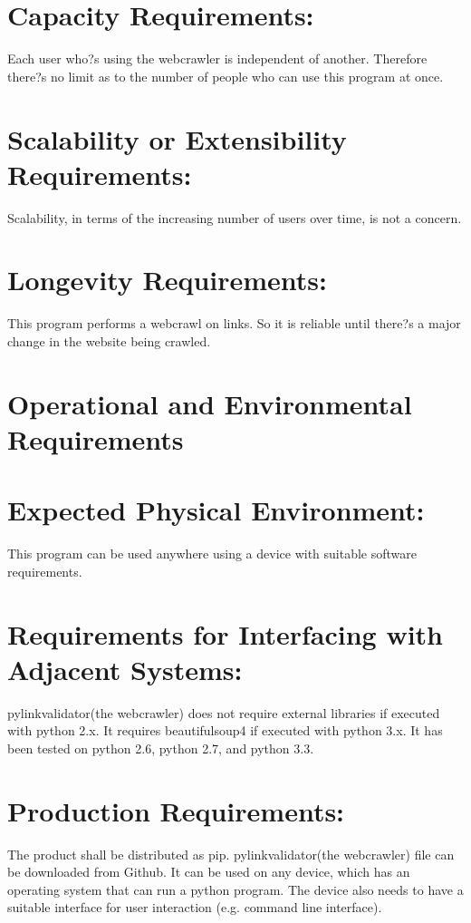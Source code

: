 \documentclass[12pt]{article}
\begin{document}
\section*{Capacity Requirements:}
Each user who?s using the webcrawler is independent of another. Therefore there?s no limit as to the number of people who can use this program at once.

\section*{Scalability or Extensibility Requirements:}
Scalability, in terms of the increasing number of users over time, is not a concern.

\section*{Longevity Requirements:}
This program performs a webcrawl on links. So it is reliable until there?s a major change in the website being crawled.

\section*{Operational and Environmental Requirements }

\section*{Expected Physical Environment:}
This program can be used anywhere using a device with suitable software requirements. 

\section*{Requirements for Interfacing with Adjacent Systems:}
pylinkvalidator(the webcrawler) does not require external libraries if executed with python 2.x. It requires beautifulsoup4 if executed with python 3.x. It has been tested on python 2.6, python 2.7, and python 3.3.


\section*{Production Requirements:}

The product shall be distributed as pip. pylinkvalidator(the webcrawler) file can be downloaded from Github. It can be used on any device, which has an operating system that can run a python program. The device also needs to have a suitable interface for user interaction (e.g. command line interface).
\end{document}
